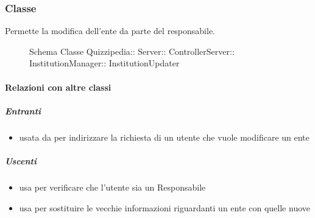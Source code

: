 \subsubsection{Classe }
Permette la modifica dell'ente da parte del responsabile.
\begin{figure}[H]
\centering
\noindent{}
\caption[Schema Classe InstitutionUpdater]{Schema Classe Quizzipedia:: Server:: ControllerServer:: InstitutionManager:: InstitutionUpdater}
\end{figure}
\paragraph{Relazioni con altre classi}
\subparagraph{Entranti}
\begin{itemize}
\item usata da  per indirizzare la richiesta di un utente che vuole modificare un ente
\end{itemize}
\subparagraph{Uscenti}
\begin{itemize}
\item usa  per verificare che l'utente sia un Responsabile
\item usa  per sostituire le vecchie informazioni riguardanti un ente con quelle nuove
\end{itemize}
